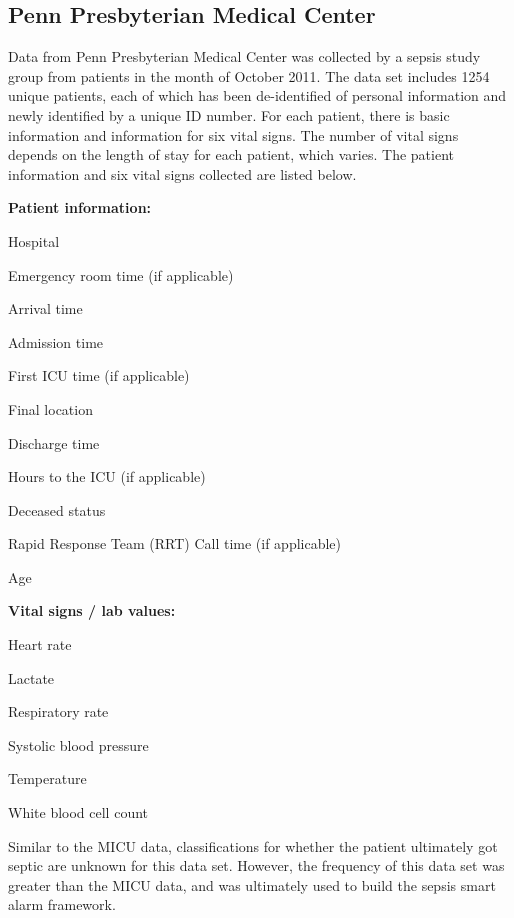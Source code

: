 \documentclass{sig-alternate}
\begin{document}
\vspace{10pt}
\subsection{Penn Presbyterian Medical Center}
\label{subsec:presby}
\vspace{10pt}

Data from Penn Presbyterian Medical Center was collected by a sepsis study group from patients in the month of October 2011.  The data set includes 1254 unique patients, each of which has been de-identified of personal information and newly identified by a unique ID number.  For each patient, there is basic information and information for six vital signs.  The number of vital signs depends on the length of stay for each patient, which varies.  The patient information and six vital signs collected are listed below.
\linebreak

\noindent \textbf{Patient information:}
\begin{itemize*}
  \item Hospital
  \item Emergency room time (if applicable)
  \item Arrival time
  \item Admission time
  \item First ICU time (if applicable)
  \item Final location
  \item Discharge time
  \item Hours to the ICU (if applicable)
  \item Deceased status
  \item Rapid Response Team (RRT) Call time (if applicable)
  \item Age
\end{itemize*}

\noindent \textbf{Vital signs / lab values:}
\begin{itemize*}
  \item Heart rate
  \item Lactate
  \item Respiratory rate
  \item Systolic blood pressure
  \item Temperature
  \item White blood cell count
\end{itemize*}

Similar to the MICU data, classifications for whether the patient ultimately got septic are unknown for this data set.  However, the frequency of this data set was greater than the MICU data, and was ultimately used to build the sepsis smart alarm framework.  
\end{document}

